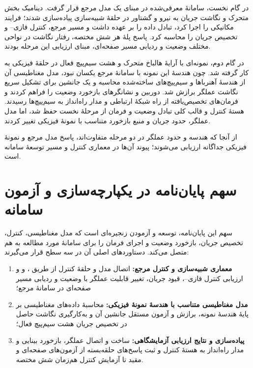 در گام نخست، سامانهٔ معرفی‌شده در \cite{xuModularMaglevDesign2024d} مبنای یک مدل مرجع قرار گرفت. دینامیک بخش متحرک و نگاشت جریان به نیرو و گشتاور در حلقهٔ شبیه‌سازی پیاده‌سازی شدند؛  فرایند مکانیکی را اجرا کرد،  تبادل داده را بر عهده داشت و  مسیر مرجع، کنترل فازی-- و تخصیص جریان را محاسبه کرد. پاسخ پلهٔ هر شش مختصه، رفتار نگاشت در نواحی مختلف وضعیت و ردیابی مسیر صفحه‌ای، مبنای ارزیابی این مرحله بودند.

در گام دوم، نمونه‌ای با آرایهٔ هالباخ متحرک و هشت سیم‌پیچ فعال در حلقهٔ فیزیکی به کار گرفته شد. چون هندسهٔ این نمونه با سامانهٔ مرجع یکسان نبود، مدل مغناطیسی آن از هندسهٔ آهنرباها و سیم‌پیچ‌های ساخته‌شده محاسبه و یک جانشین برای تشکیل سریع نگاشت عملگر برازش شد. دوربین و نشانگرهای  بازخورد وضعیت را فراهم کردند و فرمان‌های تخصیص‌یافته از راه شبکهٔ ارتباطی و مدار راه‌انداز به سیم‌پیچ‌ها رسیدند. هستهٔ کنترل و قالب کلی تبادل وضعیت و فرمان از مرحلهٔ نخست حفظ شد، اما مدل عملگر، حدود جریان و منبع بازخورد متناسب با نمونهٔ فیزیکی تغییر کردند.

از آنجا که هندسه و حدود عملگر در دو مرحله متفاوت‌اند، پاسخ مدل مرجع و نمونهٔ فیزیکی جداگانه ارزیابی می‌شوند؛ پیوند آن‌ها در معماری کنترل و مسیر توسعهٔ سامانه است.

\section{سهم پایان‌نامه در یکپارچه‌سازی و آزمون سامانه}
\label{sec:intro-contributions}

سهم این پایان‌نامه، توسعه و آزمودن زنجیره‌ای است که مدل مغناطیسی، کنترل، تخصیص جریان، بازخورد وضعیت و اجرای فرمان را برای سامانهٔ مورد مطالعه به هم متصل می‌کند. دستاوردهای اصلی آن در سه سطح قرار می‌گیرند:
\begin{enumerate}
	\item \textbf{معماری شبیه‌سازی و کنترل مرجع:} اتصال مدل و حلقهٔ کنترل از طریق ،  و  و ارزیابی کنترل فازی--، قیود جریان، تغییر قابلیت عملگر با وضعیت و ردیابی مسیر صفحه‌ای در سامانهٔ مرجع؛
	\item \textbf{مدل مغناطیسی متناسب با هندسهٔ نمونهٔ فیزیکی:} محاسبهٔ داده‌های مغناطیسی بر پایهٔ هندسهٔ نمونه، برازش و آزمون مستقل جانشین آن و به‌کارگیری نگاشت حاصل در تخصیص جریان هشت سیم‌پیچ فعال؛
	\item \textbf{پیاده‌سازی و نتایج ارزیابی آزمایشگاهی:} ساخت و اتصال عملگر، بازخورد بینایی و مدار راه‌انداز به هستهٔ کنترل و ثبت پاسخ‌های حلقه‌بسته از آزمون‌های صفحه‌ای و مقید تا آزمایش کنترل هم‌زمان شش مختصه.
\end{enumerate}

